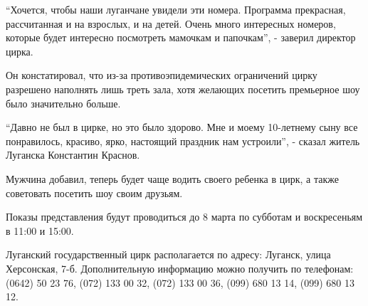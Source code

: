 \enquote{Хочется, чтобы наши луганчане увидели эти номера. Программа
прекрасная, рассчитанная и на взрослых, и на детей. Очень много интересных
номеров, которые будет интересно посмотреть мамочкам и папочкам}, - заверил
директор цирка.


Он констатировал, что из-за противоэпидемических ограничений цирку разрешено
наполнять лишь треть зала, хотя желающих посетить премьерное шоу было
значительно больше.


\enquote{Давно не был в цирке, но это было здорово. Мне и моему 10-летнему сыну
все понравилось, красиво, ярко, настоящий праздник нам устроили}, - сказал
житель Луганска Константин Краснов.

Мужчина добавил, теперь будет чаще водить своего ребенка в цирк, а также
советовать посетить шоу своим друзьям.

Показы представления будут проводиться до 8 марта по субботам и воскресеньям в
11:00 и 15:00.

Луганский государственный цирк располагается по адресу: Луганск, улица
Херсонская, 7-б. Дополнительную информацию можно получить по телефонам: (0642)
50 23 76, (072) 133 00 32, (072) 133 00 36, (099) 680 13 14, (099) 680 13 12. 
